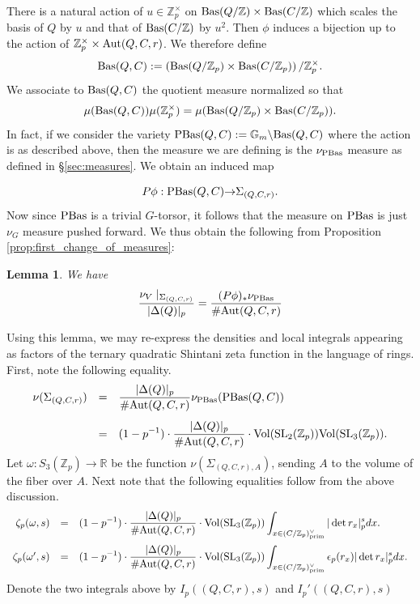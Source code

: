 \documentclass{article}
\def\Z{{\mathbb Z}}
\def\ra{{\rightarrow}}
\def\SL{{\rm SL}}
\def\bG{{\mathbb G}}
\def\Bas{{\rm Bas}}
\def\PBas{{\rm PBas}}
\def\Aut{{\rm Aut}}
\def\prim{{\rm prim}}
\def\Vol{{\rm Vol}}
\def\R{{\mathbb R}}
\def\Z{{\mathbb Z}}
\newtheorem{lemma}[theorem]{Lemma}
\begin{document}
There is a natural action of $u\in \Z_p^{\times}$ on $\Bas(Q/\Z)\times\Bas(C/\Z)$ which scales the basis of $Q$ by $u$ and that of $\Bas(C/\Z)$ by $u^2$. Then $\phi$ induces a bijection up to the action of $\Z_p^{\times}\times \Aut(Q,C,r)$. We therefore define $$\Bas(Q,C):=\left(\Bas(Q/\Z_p)\times\Bas(C/\Z_p)\right)/\Z_p^{\times}.$$ We associate to $\Bas(Q,C)$ the quotient measure normalized so that $$\mu(\Bas(Q,C))\mu(\Z_p^{\times}) = \mu(\Bas(Q/\Z_p)\times\Bas(C/\Z_p)).$$
In fact, if we consider the variety $\PBas(Q,C):=\bG_m\backslash\Bas(Q,C)$ where the action is as described above, then the measure we are defining is the $\nu_{\PBas}$ measure as defined in \S\ref{sec:measures}. We obtain an induced map

$$P\phi:\PBas(Q,C)\ra \Sigma_{(Q,C,r)}.$$ Now since $\PBas$ is a trivial $G$-torsor, it follows that the measure on $\PBas$ is just $\nu_G$ measure pushed forward. We thus obtain the following from Proposition \ref{prop:first_change_of_measures}:


\begin{lemma}\label{lem:ringstoformsmeasure}
We have
$$\frac{\nu_V\mid_{\Sigma_{(Q,C,r)}}}{|\Delta(Q)|_p}=\frac{(P\phi)_*\nu_{\PBas}}{\#\Aut(Q,C,r)}$$
\end{lemma}
Using this lemma, we may re-express the densities and local integrals appearing as factors of the ternary quadratic Shintani zeta function in the language of rings.
First, note the following equality.
\begin{equation}\label{eq:VVol_to_PBasVol}
\begin{array}{rcl}
\nu(\Sigma_{(Q,C,r)})&=&\displaystyle\frac{|\Delta(Q)|_p}{\#\Aut(Q,C,r)}\nu_{\PBas}(\PBas(Q,C))
\\[.2in]
&=&\displaystyle (1-p^{-1})\cdot\frac{|\Delta(Q)|_p}{\#\Aut(Q,C,r)}\cdot\Vol(\SL_2(\Z_p))\Vol(\SL_3(\Z_p)).
\end{array}
\end{equation}
Let $\omega:S_3(\Z_p)\to\R$ be the function $\nu(\Sigma_{(Q,C,r),A})$, sending $A$ to the volume of the fiber over $A$.
Next note that the following equalities follow from the above discussion.
\begin{equation}\label{eq:ringintegralnoep}
\begin{array}{rcl}
\zeta_p(\omega,s)&=&\displaystyle(1-p^{-1})\cdot \frac{|\Delta(Q)|_p}{\#\Aut(Q,C,r)}\cdot \Vol(\SL_3(\Z_p))\int_{x\in (C/\Z_p)^{\vee}_{\prim}}  |\det{r_x}|_p^{s}dx.
\\[.2in]
\zeta_p(\omega',s)&=&\displaystyle(1-p^{-1})\cdot\frac{|\Delta(Q)|_p}{\#\Aut(Q,C,r)}\cdot \Vol(\SL_3(\Z_p))\int_{x\in (C/\Z_p)^{\vee}_{\prim}}  \epsilon_p(r_x)|\det{r_x}|_p^{s}dx.
\end{array}
\end{equation}
Denote the two integrals above by $I_p((Q,C,r),s)$ and $I_p'((Q,C,r),s)$
\end{document}

